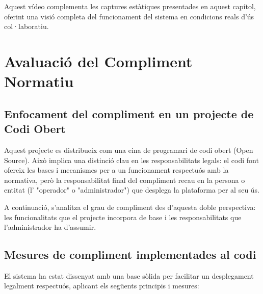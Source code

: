 Aquest vídeo complementa les captures estàtiques presentades en aquest capítol, oferint una visió completa del funcionament del sistema en condicions reals d'ús col·laboratiu.

\section{Avaluació del Compliment Normatiu}

\subsection{Enfocament del compliment en un projecte de Codi Obert}

Aquest projecte es distribueix com una eina de programari de codi obert (Open Source). Això implica una distinció clau en les responsabilitats legals: el codi font ofereix les bases i mecanismes per a un funcionament respectuós amb la normativa, però la responsabilitat final del compliment recau en la persona o entitat (l' "operador" o "administrador") que desplega la plataforma per al seu ús.

A continuació, s'analitza el grau de compliment des d'aquesta doble perspectiva: les funcionalitats que el projecte incorpora de base i les responsabilitats que l'administrador ha d'assumir.

\subsection{Mesures de compliment implementades al codi}

El sistema ha estat dissenyat amb una base sòlida per facilitar un desplegament legalment respectuós, aplicant els següents principis i mesures:

